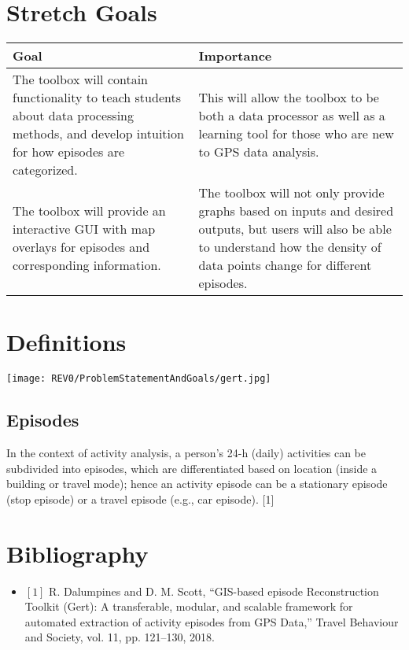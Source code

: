 \documentclass{article}
\begin{document}
\section{Stretch Goals}

\begin{tabular}{|p{6cm}|p{6cm}|}
    		\hline
    		\textbf{Goal} & \textbf{Importance} \\
    		\hline
    		The toolbox will contain functionality to teach students about data processing methods, and develop intuition for how episodes are categorized. & This will allow the toolbox to be both a data processor as well as a learning tool for those who are new to GPS data analysis.  \\
    		\hline
    		The toolbox will provide an interactive GUI with map overlays for episodes and corresponding information. & The toolbox will not only provide graphs based on inputs and desired outputs, but users will also be able to understand how the density of data points change for different episodes.  \\
    		\hline
\end{tabular}
\section{Definitions}
\texttt{[image: REV0/ProblemStatementAndGoals/gert.jpg]}
\subsection{Episodes}
In the context of activity analysis, a person’s 24-h (daily) activities can be subdivided into episodes, which are differentiated
based on location (inside a building or travel mode); hence an
activity episode can be a stationary episode (stop episode) or a travel episode (e.g., car episode). [1]

\section{Bibliography}
\begin{itemize}
    \item $[1]$ R. Dalumpines and D. M. Scott, “GIS-based episode Reconstruction Toolkit (Gert): A transferable, modular, and scalable framework for automated extraction of activity episodes from GPS Data,” Travel Behaviour and Society, vol. 11, pp. 121–130, 2018. 
\end{itemize}
 
\end{document}
